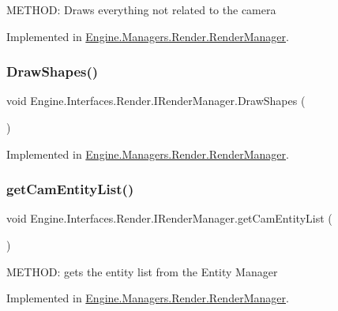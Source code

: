 M\+E\+T\+H\+OD\+: Draws everything not related to the camera 



Implemented in \hyperlink{a00526_a0dfca7db5472741f87837e7f87e90129}{Engine.\+Managers.\+Render.\+Render\+Manager}.

\mbox{\label{a00458_af785d8e5292f1f8f89c47d300e2c7d67}} 
\subsubsection{\texorpdfstring{Draw\+Shapes()}{DrawShapes()}}
{\footnotesize\ttfamily void Engine.\+Interfaces.\+Render.\+I\+Render\+Manager.\+Draw\+Shapes (\begin{DoxyParamCaption}{ }\end{DoxyParamCaption})}



Implemented in \hyperlink{a00526_af81e4faf42327afbf604c3bb4d09499a}{Engine.\+Managers.\+Render.\+Render\+Manager}.

\mbox{\label{a00458_a37f1fdeb82edc4e414404d43d1c6bb51}} 
\subsubsection{\texorpdfstring{get\+Cam\+Entity\+List()}{getCamEntityList()}}
{\footnotesize\ttfamily void Engine.\+Interfaces.\+Render.\+I\+Render\+Manager.\+get\+Cam\+Entity\+List (\begin{DoxyParamCaption}{ }\end{DoxyParamCaption})}



M\+E\+T\+H\+OD\+: gets the entity list from the Entity Manager 



Implemented in \hyperlink{a00526_a79fb84c735ca8b863eed41f51566f554}{Engine.\+Managers.\+Render.\+Render\+Manager}.

